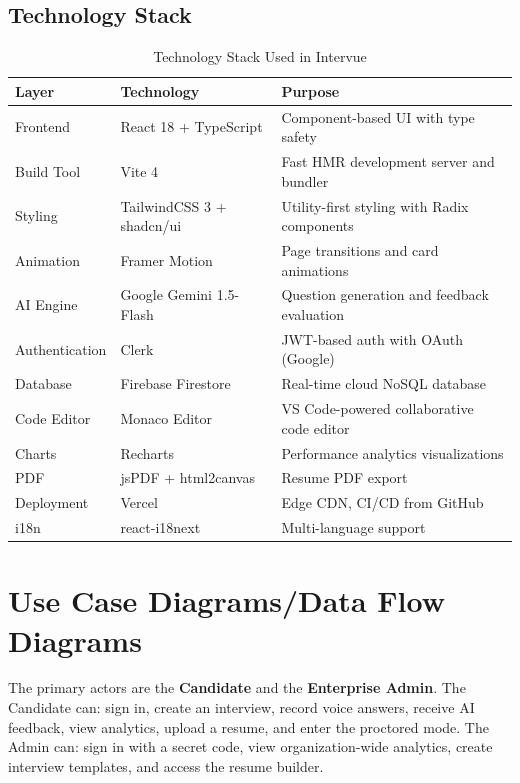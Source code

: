 \documentclass{fisatprojectfinal}
\begin{document}
\subsection{Technology Stack}

\begin{table}[h!]
\centering
\caption{Technology Stack Used in Intervue}
\begin{tabular}{|p{2.8cm}|p{3.8cm}|p{5.5cm}|}
\hline
\textbf{Layer} & \textbf{Technology} & \textbf{Purpose} \\
\hline
Frontend & React 18 + TypeScript & Component-based UI with type safety \\
\hline
Build Tool & Vite 4 & Fast HMR development server and bundler \\
\hline
Styling & TailwindCSS 3 + shadcn/ui & Utility-first styling with Radix components \\
\hline
Animation & Framer Motion & Page transitions and card animations \\
\hline
AI Engine & Google Gemini 1.5-Flash & Question generation and feedback evaluation \\
\hline
Authentication & Clerk & JWT-based auth with OAuth (Google) \\
\hline
Database & Firebase Firestore & Real-time cloud NoSQL database \\
\hline
Code Editor & Monaco Editor & VS Code-powered collaborative code editor \\
\hline
Charts & Recharts & Performance analytics visualizations \\
\hline
PDF & jsPDF + html2canvas & Resume PDF export \\
\hline
Deployment & Vercel & Edge CDN, CI/CD from GitHub \\
\hline
i18n & react-i18next & Multi-language support \\
\hline
\end{tabular}
\end{table}

\section{Use Case Diagrams/Data Flow Diagrams}
The primary actors are the \textbf{Candidate} and the \textbf{Enterprise Admin}. The
Candidate can: sign in, create an interview, record voice answers, receive AI feedback, view
analytics, upload a resume, and enter the proctored mode. The Admin can: sign in with a
secret code, view organization-wide analytics, create interview templates, and access the
resume builder.
\end{document}
